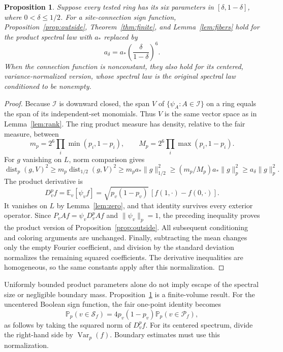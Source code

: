 \documentclass[11pt]{amsart}
\newtheorem{proposition}[theorem]{Proposition}
\theoremstyle{remark}
\newcommand{\Prob}{\mathbb P}
\newcommand{\E}{\mathbb E}
\newcommand{\cS}{\mathcal S}
\newcommand{\cP}{\mathcal P}
\newcommand{\cI}{\mathcal I}
\newcommand{\astar}{a_*}
\DeclareMathOperator{\dist}{dist}
\begin{document}
\begin{proposition}\label{prop:biased}
Suppose every tested ring has its six parameters in $[\delta,1-\delta]$, where $0<\delta\le1/2$. For a site-connection sign function, Proposition~\ref{prop:outside}, Theorem~\ref{thm:finite}, and Lemma~\ref{lem:fibers} hold for the product spectral law with $\astar$ replaced by
\[
 a_\delta=\astar\left(\frac{\delta}{1-\delta}\right)^6.
\]
When the connection function is nonconstant, they also hold for its centered, variance-normalized version, whose spectral law is the original spectral law conditioned to be nonempty.
\end{proposition}
\begin{proof}
Because $\cI$ is downward closed, the span $V$ of $\{\psi_A:A\in\cI\}$ on a ring equals the span of its independent-set monomials. Thus $V$ is the same vector space as in Lemma~\ref{lem:rank}. The ring product measure has density, relative to the fair measure, between
\[
 m_p=2^6\prod_i\min(p_i,1-p_i),\qquad
 M_p=2^6\prod_i\max(p_i,1-p_i).
\]
For $g$ vanishing on $L$, norm comparison gives
\[
 \dist_p(g,V)^2
 \ge m_p\dist_{1/2}(g,V)^2
 \ge m_p\astar\|g\|_{1/2}^2
 \ge (m_p/M_p)\astar\|g\|_p^2
 \ge a_\delta\|g\|_p^2.
\]
The product derivative is
\[
 D_v^pf=\E_v[\psi_vf]
 =\sqrt{p_v(1-p_v)}\,[f(1,\cdot)-f(0,\cdot)].
\]
It vanishes on $L$ by Lemma~\ref{lem:zero}, and that identity survives every exterior operator. Since $P_vAf=\psi_vD_v^pAf$ and $\|\psi_v\|_p=1$, the preceding inequality proves the product version of Proposition~\ref{prop:outside}. All subsequent conditioning and coloring arguments are unchanged. Finally, subtracting the mean changes only the empty Fourier coefficient, and division by the standard deviation normalizes the remaining squared coefficients. The derivative inequalities are homogeneous, so the same constants apply after this normalization.
\end{proof}

Uniformly bounded product parameters alone do not imply escape of the spectral size or negligible boundary mass. Proposition~\ref{prop:biased} is a finite-volume result. For the uncentered Boolean sign function, the fair one-point identity becomes
\[
 \Prob_p(v\in\cS_f)=4p_v(1-p_v)\Prob_p(v\in\cP_f),
\]
as follows by taking the squared norm of $D_v^pf$. For its centered spectrum, divide the right-hand side by $\operatorname{Var}_p(f)$. Boundary estimates must use this normalization.
\end{document}
